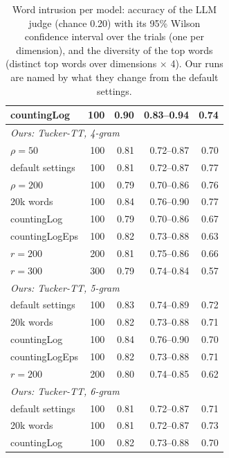 \begin{table}[t]
\begin{tabular}{lrrrr}
    countingLog & 100 & \textbf{0.90} & 0.83--0.94 & 0.74 \\
    \midrule
    \multicolumn{5}{l}{\textit{Ours: Tucker-TT, 4-gram}} \\
    $\rho{=}50$ & 100 & 0.81 & 0.72--0.87 & 0.70 \\
    default settings & 100 & 0.81 & 0.72--0.87 & 0.77 \\
    $\rho{=}200$ & 100 & 0.79 & 0.70--0.86 & 0.76 \\
    20k words & 100 & 0.84 & 0.76--0.90 & 0.77 \\
    countingLog & 100 & 0.79 & 0.70--0.86 & 0.67 \\
    countingLogEps & 100 & 0.82 & 0.73--0.88 & 0.63 \\
    $r{=}200$ & 200 & 0.81 & 0.75--0.86 & 0.66 \\
    $r{=}300$ & 300 & 0.79 & 0.74--0.84 & 0.57 \\
    \midrule
    \multicolumn{5}{l}{\textit{Ours: Tucker-TT, 5-gram}} \\
    default settings & 100 & 0.83 & 0.74--0.89 & 0.72 \\
    20k words & 100 & 0.82 & 0.73--0.88 & 0.71 \\
    countingLog & 100 & 0.84 & 0.76--0.90 & 0.70 \\
    countingLogEps & 100 & 0.82 & 0.73--0.88 & 0.71 \\
    $r{=}200$ & 200 & 0.80 & 0.74--0.85 & 0.62 \\
    \midrule
    \multicolumn{5}{l}{\textit{Ours: Tucker-TT, 6-gram}} \\
    default settings & 100 & 0.81 & 0.72--0.87 & 0.71 \\
    20k words & 100 & 0.81 & 0.72--0.87 & 0.73 \\
    countingLog & 100 & 0.82 & 0.73--0.88 & 0.70 \\
    \bottomrule
  \end{tabular}
  \caption{Word intrusion per model: accuracy of the LLM judge (chance 0.20) with its 95\% Wilson confidence interval over the trials (one per dimension), and the diversity of the top words (distinct top words over dimensions $\times$ 4). Our runs are named by what they change from the default settings.}
  \label{tab:intrusion}
\end{table}

